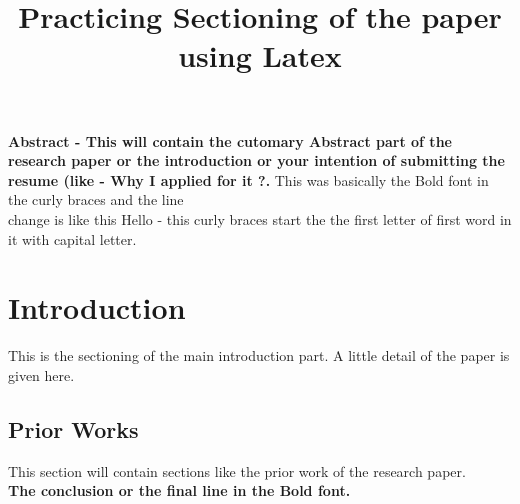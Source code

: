 \documentclass{article}
\title{Practicing Sectioning of the paper using Latex}
\begin{document}
  \maketitle
  
  \textbf{Abstract - This will contain the cutomary Abstract part of the research paper or the introduction or your intention of submitting the resume (like - Why I applied for it  ?.} This was basically the Bold font in the curly braces and the line \\ change is like this {Hello - this curly braces start the the} {first letter of first word in it with capital letter}.
  \section{Introduction}
  
     This is the sectioning of the main introduction part. A little detail of the paper is given here.
  \subsection{Prior Works}
  
    This section will contain sections like the prior work of the research paper. \\
     
  \textbf{The conclusion or the final line in the Bold font.}   
     
     
\end{document}
